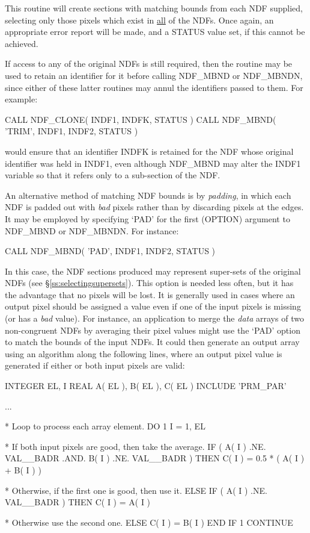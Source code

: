 \documentclass[twoside,11pt,nolof]{starlink}
\providecommand{\st}[1]{{\emph{#1}}}
\begin{document}
This routine will create sections with matching bounds from each NDF
supplied, selecting only those pixels which exist in \underline{all} of the
NDFs.
Once again, an appropriate error report will be made, and a STATUS value
set, if this cannot be achieved.

If access to any of the original NDFs is still required, then the routine
 may be used to retain an identifier for it before calling
NDF\_MBND or NDF\_MBNDN, since either of these latter routines may annul the
identifiers passed to them.
For example:

\small
\begin{terminalv}
      CALL NDF_CLONE( INDF1, INDFK, STATUS )
      CALL NDF_MBND( 'TRIM', INDF1, INDF2, STATUS )
\end{terminalv}
\normalsize

would ensure that an identifier INDFK is retained for the NDF whose original
identifier was held in INDF1, even although NDF\_MBND may alter the INDF1
variable so that it refers only to a sub-section of the NDF.

An alternative method of matching NDF bounds is by \st{padding}, in which
each NDF is padded out with \st{bad\/} pixels rather than by discarding
pixels at the edges.
It may be employed by specifying `PAD' for the first (OPTION) argument to
NDF\_MBND or NDF\_MBNDN.
For instance:

\small
\begin{terminalv}
      CALL NDF_MBND( 'PAD', INDF1, INDF2, STATUS )
\end{terminalv}
\normalsize

In this case, the NDF sections produced may represent super-sets of the
original NDFs (see \S\ref{ss:selectingsupersets}).
This option is needed less often, but it has the advantage that no pixels
will be lost.
It is generally used in cases where an output pixel should be assigned a
value even if one of the input pixels is missing (or has a \st{bad\/} value).
For instance, an application to merge the \st{data\/} arrays of two
non-congruent NDFs by averaging their pixel values might use the `PAD'
option to match the bounds of the input NDFs.
It could then generate an output array using an algorithm along the
following lines, where an output pixel value is generated if either or both
input pixels are valid:

\small
\begin{terminalv}
      INTEGER EL, I
      REAL A( EL ), B( EL ), C( EL )
      INCLUDE 'PRM_PAR'

      ...

*  Loop to process each array element.
      DO 1 I = 1, EL

*  If both input pixels are good, then take the average.
         IF ( A( I ) .NE. VAL__BADR .AND. B( I ) .NE. VAL__BADR ) THEN
            C( I ) = 0.5 * ( A( I ) + B( I ) )

*  Otherwise, if the first one is good, then use it.
         ELSE IF ( A( I ) .NE. VAL__BADR ) THEN
            C( I ) = A( I )

*  Otherwise use the second one.
         ELSE
            C( I ) = B( I )
         END IF
 1    CONTINUE
\end{terminalv}
\normalsize
\end{document}
